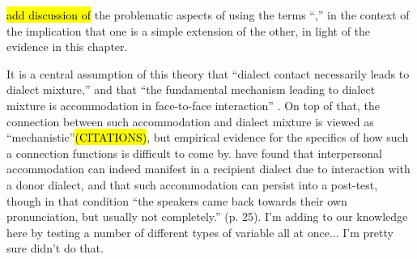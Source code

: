     \hl{add discussion of} the problematic aspects of using the terms ``\sla{},'' in the context of the implication that one is a simple extension of the other, in light of the evidence in this chapter.
    
    It is a central assumption of this theory that ``dialect contact necessarily leads to dialect mixture,'' and that ``the fundamental mechanism leading to dialect mixture is accommodation in face-to-face interaction'' \citep[p. 242-3]{trudgill2008colonial}. On top of that, the connection between such accommodation and dialect mixture is viewed as ``mechanistic''\hl{(CITATIONS)}, but empirical evidence for the specifics of how such a connection functions is difficult to come by. \cite{delvaux2007influence} have found that interpersonal accommodation can indeed manifest in a recipient dialect due to interaction with a donor dialect, and that such accommodation can persist into a post-test, though in that condition  ``the speakers came back towards their own pronunciation, but usually not completely.'' (p. 25). I'm adding to our knowledge here by testing a number of different types of variable all at once... I'm pretty sure \cite{delvaux2007influence} didn't do that. %
    

